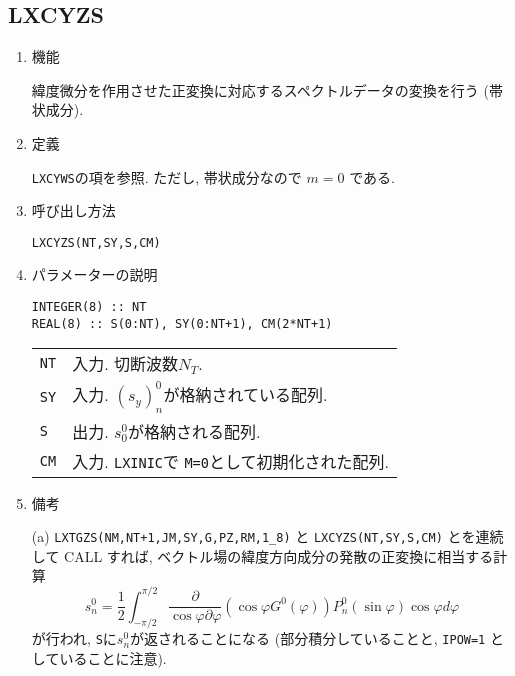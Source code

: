 \documentclass[a4j]{jarticle}
\begin{document}
\subsection{LXCYZS}

\begin{enumerate}

\item 機能

  緯度微分を作用させた正変換に対応するスペクトルデータの変換を行う
  (帯状成分).
  
\item 定義

\texttt{LXCYWS}の項を参照. ただし, 帯状成分なので $m=0$ である.

\item 呼び出し方法 
    
\texttt{LXCYZS(NT,SY,S,CM)}
  
\item パラメーターの説明

\begin{verbatim}
INTEGER(8) :: NT
REAL(8) :: S(0:NT), SY(0:NT+1), CM(2*NT+1)
\end{verbatim}
      
\begin{tabular}{ll}
\texttt{NT} & 入力. 切断波数$N_T$.\\
\texttt{SY} & 入力. $(s_y)^0_n$が格納されている配列.\\
\texttt{S} & 出力. $s^0_0$が格納される配列.\\
\texttt{CM}  & 入力. \texttt{LXINIC}で \texttt{M=0}として初期化された配列.
\end{tabular}

\item 備考

(a) \texttt{LXTGZS(NM,NT+1,JM,SY,G,PZ,RM,1\_8)} と
    \texttt{LXCYZS(NT,SY,S,CM)}
    とを連続して CALL すれば, 
    ベクトル場の緯度方向成分の発散の正変換に相当する計算
\begin{equation}
s^0_n=\frac1{2}\int^{\pi/2}_{-\pi/2}
\frac{\partial}{\cos\varphi\partial\varphi}
\left(\cos\varphi G^0(\varphi)\right)
P^0_n(\sin\varphi)\cos\varphi d\varphi
\end{equation}
が行われ, \texttt{S}に$s^0_n$が返されることになる
(部分積分していることと, \texttt{IPOW=1} としていることに注意).
  
\end{enumerate}

\end{document}
